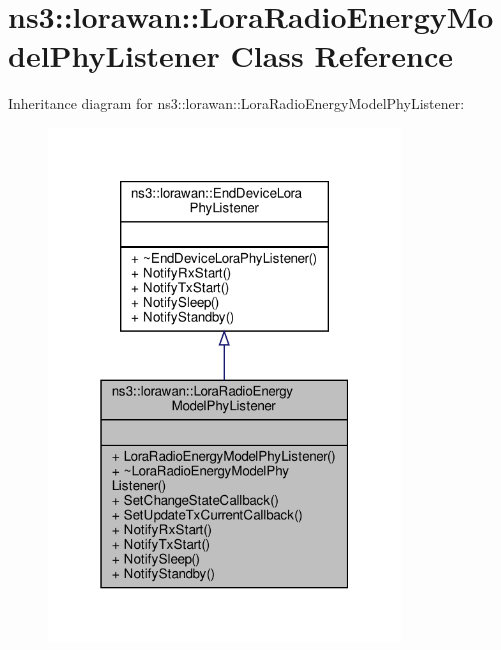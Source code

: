 \hypertarget{classns3_1_1lorawan_1_1LoraRadioEnergyModelPhyListener}{}\section{ns3\+:\+:lorawan\+:\+:Lora\+Radio\+Energy\+Model\+Phy\+Listener Class Reference}
\label{classns3_1_1lorawan_1_1LoraRadioEnergyModelPhyListener}


Inheritance diagram for ns3\+:\+:lorawan\+:\+:Lora\+Radio\+Energy\+Model\+Phy\+Listener\+:
\nopagebreak
\begin{figure}[H]
\begin{center}
\leavevmode
\includegraphics[width=265pt]{classns3_1_1lorawan_1_1LoraRadioEnergyModelPhyListener__inherit__graph}
\end{center}
\end{figure}


